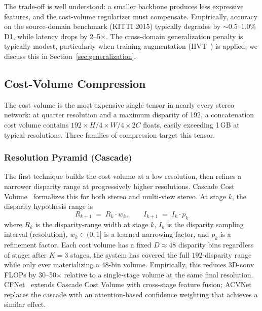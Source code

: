 The trade-off is well understood: a smaller backbone produces less expressive features, and the cost-volume regularizer must compensate. Empirically, accuracy on the source-domain benchmark (KITTI 2015) typically degrades by $\sim$0.5--1.0\% D1, while latency drops by 2--5$\times$. The cross-domain generalization penalty is typically modest, particularly when training augmentation (HVT~\cite{chang2023hvt}) is applied; we discuss this in Section~\ref{sec:generalization}.

\subsection{Cost-Volume Compression}
\label{ssec:costvol}

The cost volume is the most expensive single tensor in nearly every stereo network: at quarter resolution and a maximum disparity of 192, a concatenation cost volume contains $192 \times H/4 \times W/4 \times 2C$ floats, easily exceeding 1\,GB at typical resolutions. Three families of compression target this tensor.

\subsubsection{Resolution Pyramid (Cascade)}

The first technique builds the cost volume at a low resolution, then refines a narrower disparity range at progressively higher resolutions. Cascade Cost Volume~\cite{gu2020cascade} formalizes this for both stereo and multi-view stereo. At stage $k$, the disparity hypothesis range is
\begin{equation}
R_{k+1} \;=\; R_k \cdot w_k, \qquad I_{k+1} \;=\; I_k \cdot p_k
\label{eq:cascade}
\end{equation}
where $R_k$ is the disparity-range width at stage $k$, $I_k$ is the disparity sampling interval (resolution), $w_k \in (0, 1]$ is a learned narrowing factor, and $p_k$ is a refinement factor. Each cost volume has a fixed $D \approx 48$ disparity bins regardless of stage; after $K = 3$ stages, the system has covered the full $192$-disparity range while only ever materializing a 48-bin volume. Empirically, this reduces 3D-conv FLOPs by 30--50$\times$ relative to a single-stage volume at the same final resolution. CFNet~\cite{shen2021cfnet} extends Cascade Cost Volume with cross-stage feature fusion; ACVNet~\cite{xu2022acvnet} replaces the cascade with an attention-based confidence weighting that achieves a similar effect.

